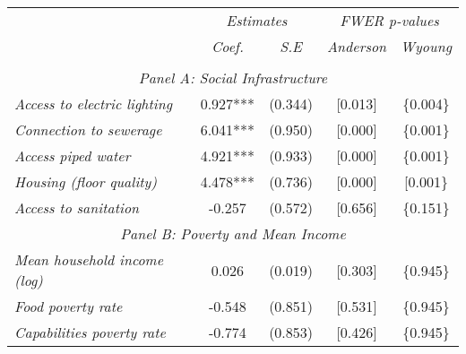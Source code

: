 

\begin{tabular}{lcccc}

\toprule

\multicolumn{1}{l}{} & \multicolumn{2}{c}{\textit{Estimates}} & \multicolumn{2}{c}{\textit{FWER p-values}} \\
\multicolumn{1}{l}{} & \multicolumn{1}{c}{\textit{Coef.}} & \multicolumn{1}{c}{\textit{S.E}} & \multicolumn{1}{c}{\textit{Anderson}} & \multicolumn{1}{c}{\textit{Wyoung}} \\ 
 
\cmidrule(l{1mm}r{1mm}){2-3} \cmidrule(l{1mm}r{1mm}){4-5}  \\

\midrule

\multicolumn{5}{c}{\textit{Panel  A: Social Infrastructure}}   \\  

\textit{Access to electric lighting}  &  0.927***  
					   & (0.344) 
					   & [0.013]  
					   & \{0.004\} \\[0.2cm]
					   
\textit{Connection to sewerage}  &  6.041***  
					   & (0.950) 
					   & [0.000]  
					   & \{0.001\} \\[0.2cm]
					   
\textit{Access piped water}  &  4.921***  
					   & (0.933) 
					   & [0.000]  
					   & \{0.001\} \\[0.2cm]
					   
\textit{Housing (floor quality)}  &  4.478***  
					   & (0.736) 
					   & [0.000]  
					   & [0.001\} \\[0.2cm]
					   
\textit{Access to sanitation}  &  -0.257  
					   & (0.572) 
					   & [0.656]  
					   & \{0.151\} \\[0.2cm]

\midrule

\multicolumn{5}{c}{\textit{Panel  B: Poverty and Mean Income}}   \\[0.2cm]  

\textit{Mean household income (log)}  &  0.026  
					   & (0.019) 
					   &  [0.303]  
					   & \{0.945\} \\[0.2cm]
					   
\textit{Food poverty rate}  &  -0.548  
					   & (0.851) 
					   &  [0.531]  
					   & \{0.945\} \\[0.2cm]
					   
\textit{Capabilities poverty rate}  &  -0.774  
					   & (0.853) 
					   &  [0.426]  
					   & \{0.945\} \\[0.2cm]
					   

\end{tabular}
